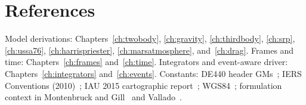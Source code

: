 \section{References}
\label{sec:env:references}

Model derivations: Chapters~\ref{ch:twobody}, \ref{ch:gravity},
\ref{ch:thirdbody}, \ref{ch:srp}, \ref{ch:ussa76},
\ref{ch:harrispriester}, \ref{ch:marsatmosphere}, and~\ref{ch:drag}.
Frames and time: Chapters~\ref{ch:frames} and~\ref{ch:time}. Integrators
and event-aware driver: Chapters~\ref{ch:integrators}
and~\ref{ch:events}. Constants: DE440 header GMs~\cite{park2021}; IERS
Conventions (2010)~\cite{iers2010}; IAU 2015 cartographic
report~\cite{archinal2018}; WGS84~\cite{nima2000}; formulation context in
Montenbruck and Gill~\cite{montenbruck2000} and
Vallado~\cite{vallado2013}.
